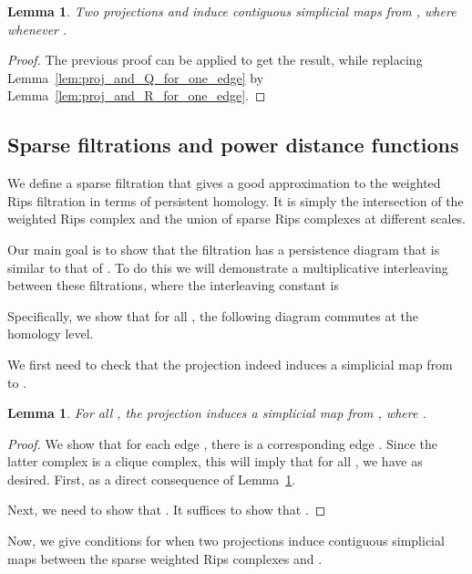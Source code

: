 \documentclass[a4paper]{article}
\newtheorem{lemma}[theorem]{Lemma}
\begin{document}
  \begin{lemma}\label{lem:proj_and_R}
    Two projections  and  induce contiguous simplicial maps from , where  whenever .    
  \end{lemma}
  
\begin{proof}
The previous proof can be applied to get the result, while replacing Lemma~\ref{lem:proj_and_Q_for_one_edge} by Lemma~\ref{lem:proj_and_R_for_one_edge}.
\end{proof}



%
 
\subsection{Sparse filtrations and power distance functions} \label{sec:rips_interleaving}


We define a sparse filtration that gives a good approximation to the weighted Rips filtration  in terms of persistent homology.
  It is simply the intersection of the weighted Rips complex and the union of sparse Rips complexes at different scales.
  

  Our main goal is to show that the filtration  has a persistence diagram that is similar to that of .
  To do this we will demonstrate a multiplicative interleaving between these filtrations, where the interleaving constant is 
  
  Specifically, we show that for all , the following diagram commutes at the homology level. 
  
  

  We first need to check that the projection  indeed induces a simplicial map from  to .

  \begin{lemma}\label{lem:proj_is_simplicial_R_to_T}
    For all , the projection  induces a simplicial map from , where .
  \end{lemma}
  \begin{proof}
    We show that for each edge , there is a corresponding edge .
    Since the latter complex is a clique complex, this will imply that for all , we have  as desired.
    First,  as a direct consequence of Lemma~\ref{lem:proj_and_R}.

    Next, we need to show that .
    It suffices to show that .
    
  \end{proof}
  
  Now, we give conditions for when two projections induce contiguous simplicial maps between the sparse weighted Rips complexes  and .
\end{document}
